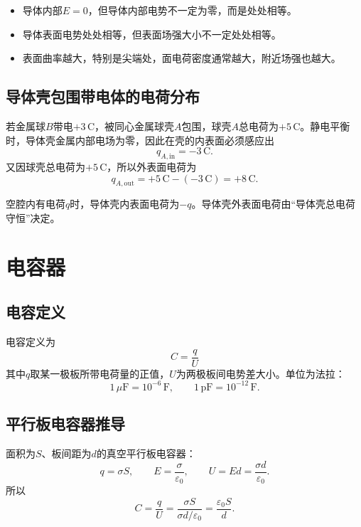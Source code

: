 \documentclass[UTF8,zihao=-4]{ctexart}
\newcommand{\epsz}{\varepsilon_0}
\begin{document}
\begin{warnbox}[静电平衡判断]
\begin{itemize}
  \item 导体内部\(E=0\)，但导体内部电势不一定为零，而是处处相等。
  \item 导体表面电势处处相等，但表面场强大小不一定处处相等。
  \item 表面曲率越大，特别是尖端处，面电荷密度通常越大，附近场强也越大。
\end{itemize}
\end{warnbox}

\subsection{导体壳包围带电体的电荷分布}

若金属球\(B\)带电\(+3\,\mathrm C\)，被同心金属球壳\(A\)包围，球壳\(A\)总电荷为\(+5\,\mathrm C\)。静电平衡时，导体壳金属内部电场为零，因此在壳的内表面必须感应出
\[
q_{A,\mathrm{in}}=-3\,\mathrm C.
\]
又因球壳总电荷为\(+5\,\mathrm C\)，所以外表面电荷为
\[
q_{A,\mathrm{out}}=+5\,\mathrm C-(-3\,\mathrm C)=+8\,\mathrm C.
\]

\begin{keybox}[导体壳题型口诀]
空腔内有电荷\(q\)时，导体壳内表面电荷为\(-q\)。导体壳外表面电荷由“导体壳总电荷守恒”决定。
\end{keybox}

\section{电容器}

\subsection{电容定义}

电容定义为
\begin{equation}
\boxed{C=\frac{q}{U}}
\end{equation}
其中\(q\)取某一极板所带电荷量的正值，\(U\)为两极板间电势差大小。单位为法拉：
\[
1\,\mu\mathrm F=10^{-6}\,\mathrm F,
\qquad
1\,\mathrm{pF}=10^{-12}\,\mathrm F.
\]

\subsection{平行板电容器推导}

面积为\(S\)、板间距为\(d\)的真空平行板电容器：
\[
q=\sigma S,
\qquad
E=\frac{\sigma}{\epsz},
\qquad
U=Ed=\frac{\sigma d}{\epsz}.
\]
所以
\begin{equation}
C=\frac{q}{U}=\frac{\sigma S}{\sigma d/\epsz}=\boxed{\frac{\epsz S}{d}}.
\end{equation}
\end{document}
